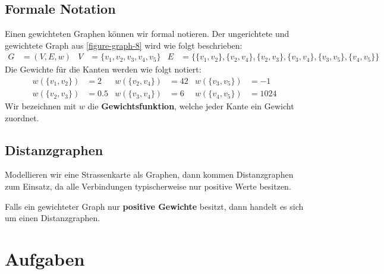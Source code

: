 \subsection{Formale Notation}

Einen gewichteten Graphen können wir formal notieren. Der ungerichtete und gewichtete Graph aus \autoref{figure-graph-8} wird wie folgt beschrieben:
\begin{align*}
G &= (V, E, w) & V &= \{v_1, v_2, v_3, v_4, v_5\} & E &= \{\{v_1, v_2\}, \{v_2, v_4\}, \{v_2, v_3\}, \{v_3, v_4\}, \{v_3, v_5\}, \{v_4, v_5\}\}
\end{align*}
Die Gewichte für die Kanten werden wie folgt notiert:
\begin{align*}
w(\{v_1, v_2\}) &= 2 & w(\{v_2, v_4\}) &= 42 & w(\{v_3, v_5\}) &= -1 \\
w(\{v_2, v_3\}) &= 0.5 & w(\{v_3, v_4\}) &= 6 & w(\{v_4, v_5\}) &= 1024
\end{align*}
Wir bezeichnen mit $w$ die \textbf{Gewichtsfunktion}, welche jeder Kante ein Gewicht zuordnet.

\subsection{Distanzgraphen}

Modellieren wir eine Strassenkarte als Graphen, dann kommen Distanzgraphen zum Einsatz, da alle Verbindungen typischerweise nur positive Werte besitzen.

\begin{definition}[Distanzgraph]
	Falls ein gewichteter Graph nur \textbf{positive Gewichte} besitzt, dann handelt es sich um einen Distanzgraphen.
\end{definition}

\section{Aufgaben}

